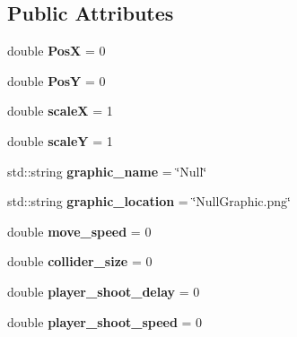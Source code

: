 \subsection*{Public Attributes}
\begin{DoxyCompactItemize}
\item 
\mbox{\label{struct_game_object_data_a4b5355c5441e656b0471aa9a7c95f317}} 
double {\bfseries PosX} = 0
\item 
\mbox{\label{struct_game_object_data_a05f269615fa3a200e403b82c64ed5d0b}} 
double {\bfseries PosY} = 0
\item 
\mbox{\label{struct_game_object_data_af239b2cb2ec2ce76addeef706808a7e8}} 
double {\bfseries scaleX} = 1
\item 
\mbox{\label{struct_game_object_data_a1211a2ce5ecb3fa9d558f32e15944d4f}} 
double {\bfseries scaleY} = 1
\item 
\mbox{\label{struct_game_object_data_af3118348a1a1a5e0a1bb554a88c9269e}} 
std\+::string {\bfseries graphic\+\_\+name} = \char`\"{}Null\char`\"{}
\item 
\mbox{\label{struct_game_object_data_a3c37e0c2c0e7bde6175d101467610242}} 
std\+::string {\bfseries graphic\+\_\+location} = \char`\"{}Null\+Graphic.\+png\char`\"{}
\item 
\mbox{\label{struct_game_object_data_aad5f3a3df2d0057e38bf168aa3a550fa}} 
double {\bfseries move\+\_\+speed} = 0
\item 
\mbox{\label{struct_game_object_data_a73750fae67f346c77192bb4e891576f0}} 
double {\bfseries collider\+\_\+size} = 0
\item 
\mbox{\label{struct_game_object_data_a752d35a34e94ad3e9a82eef0bdee6236}} 
double {\bfseries player\+\_\+shoot\+\_\+delay} = 0
\item 
\mbox{\label{struct_game_object_data_a0a53b12fb9f565f20446b1e5150346e8}} 
double {\bfseries player\+\_\+shoot\+\_\+speed} = 0

\end{DoxyCompactItemize}
